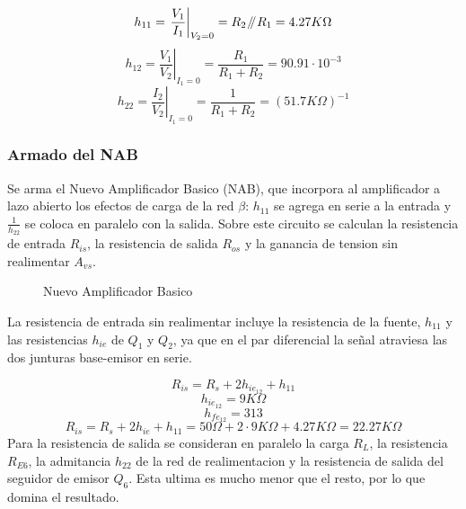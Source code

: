 \documentclass[11pt,a4paper]{article}
\newcommand{\parallelsum}{\mathbin{\!/\mkern-5mu/\!}}
\begin{document}
\begin{equation}
h_{11} = \left. \frac{V_1}{I_1} \right\vert_{V_2 = 0} = R_2 \parallelsum R_1 = 4.27 K\Omega 
\end{equation}
\begin{equation}
h_{12} = \left. \frac{V_1}{V_2} \right\vert_{I_1 = 0} = \frac{R_1}{R_1 + R_2} = 90.91 \cdot 10^{-3} 
\end{equation}
\begin{equation}
h_{22} = \left. \frac{I_2}{V_2} \right\vert_{I_1 = 0} = \frac{1}{R_1 + R_2} = (51.7 K\Omega)^{-1} 
\end{equation}

\subsubsection{Armado del NAB}

Se arma el Nuevo Amplificador Basico (NAB), que incorpora al amplificador a lazo abierto los efectos de carga de la red \(\beta\): \(h_{11}\) se agrega en serie a la entrada y \(\frac{1}{h_{22}}\) se coloca en paralelo con la salida. Sobre este circuito se calculan la resistencia de entrada \(R_{is}\), la resistencia de salida \(R_{os}\) y la ganancia de tension sin realimentar \(A_{vs}\).

\begin{figure}[h!]
    \centering
    
    \caption{Nuevo Amplificador Basico}
\end{figure}

La resistencia de entrada sin realimentar incluye la resistencia de la fuente, \(h_{11}\) y las resistencias \(h_{ie}\) de \(Q_1\) y \(Q_2\), ya que en el par diferencial la señal atraviesa las dos junturas base-emisor en serie.

\begin{equation}
R_{is} = R_s + 2 h_{ie_{12}} + h_{11} 
\end{equation}
\begin{equation}
h_{ie_{12}} = 9K\Omega
\end{equation}
\begin{equation}
h_{fe_{12}} = 313
\end{equation}
\begin{equation}
R_{is} = R_s + 2 h_{ie} + h_11 = 50\Omega + 2 \cdot 9K\Omega + 4.27 K\Omega  = 22.27K\Omega 
\end{equation}
Para la resistencia de salida se consideran en paralelo la carga \(R_L\), la resistencia \(R_{E6}\), la admitancia \(h_{22}\) de la red de realimentacion y la resistencia de salida del seguidor de emisor \(Q_6\). Esta ultima es mucho menor que el resto, por lo que domina el resultado.
\end{document}
